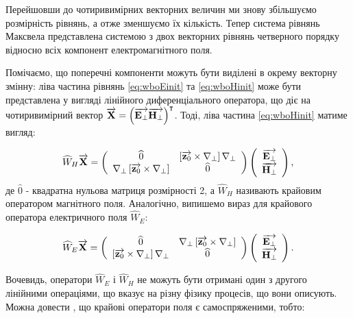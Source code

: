Перейшовши до чотиривимірних векторних величин ми знову збільшуємо розмірність 
рівнянь, а отже зменшуємо їх кількість. Тепер система рівнянь Максвела
представлена системою з двох векторних рівнянь четверного порядку відносно 
всіх компонент електромагнітного поля. 

Помічаємо, що поперечні компоненти можуть бути виділені в окрему векторну 
змінну: ліва частина рівнянь \eqref{eq:wboEinit} та \eqref{eq:wboHinit} може 
бути представлена у вигляді лінійного диференціального оператора, що діє на
чотиривимірний вектор 
$ \overrightarrow{\mathbf X} = \left( \overrightarrow{\mathbf E_\perp} \overrightarrow{\mathbf H_\perp} \right)^\intercal $. Тоді,
ліва частина \eqref{eq:wboHinit} матиме вигляд:

\begin{equation} \label{eq:W_H}
\widehat{W}_H \overrightarrow{\mathbf X} = \left( \begin{array}{cc} \widehat{0} & 
\left[ \overrightarrow{\mathbf z_0} \times \nabla_\perp \right] \nabla_\perp \\
\nabla_\perp \left[ \overrightarrow{\mathbf z_0} \times \nabla_\perp \right] &
\widehat{0} \\ \end{array} \right) \left( \begin{array}{c} 
\overrightarrow{\mathbf E_\perp} \\ \overrightarrow{\mathbf H_\perp} \\ \end{array} \right),
\end{equation}
%
де $ \widehat{0} $ - квадратна нульова матриця розмірності 2, а 
$ \widehat{W}_H $ називають крайовим оператором магнітного поля. Аналогічно,
випишемо вираз для крайового оператора електричного поля $ \widehat{W}_E $:

\begin{equation} \label{eq:W_E}
\widehat{W}_E \overrightarrow{\mathbf X} = \left( \begin{array}{cc} \widehat{0} & 
\nabla_\perp \left[ \overrightarrow{\mathbf z_0} \times \nabla_\perp \right] \\
\left[ \overrightarrow{\mathbf z_0} \times \nabla_\perp \right] \nabla_\perp &
\widehat{0} \\ \end{array} \right) \left( \begin{array}{c} 
\overrightarrow{\mathbf E_\perp} \\ \overrightarrow{\mathbf H_\perp} \\ \end{array} \right).
\end{equation}

Вочевидь, оператори $ \widehat{W}_E $ і $ \widehat{W}_H $ не можуть бути 
отримані один з другого лінійними операціями, що вказує на різну фізику 
процесів, що вони описують. Можна довести 
\cite{imp:Dumin1996, imp:Tretyakov1993}, що крайові оператори поля є 
самоспряженими, тобто:

